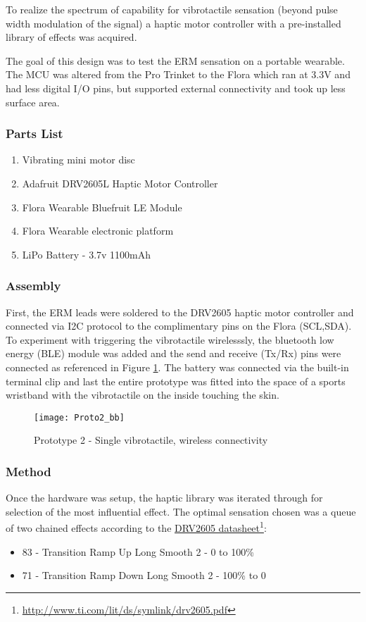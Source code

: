 To realize the spectrum of capability for vibrotactile sensation (beyond pulse width modulation of the signal) a haptic motor controller with a pre-installed library of effects was acquired. 

The goal of this design was to test the ERM sensation on a portable wearable. The MCU was altered from the Pro Trinket to the Flora which ran at 3.3V and had less digital I/O pins, but supported external connectivity and took up less surface area.

\subsubsection{Parts List}
\begin{enumerate}
    \item Vibrating mini motor disc
    \item Adafruit DRV2605L Haptic Motor Controller
    \item Flora Wearable Bluefruit LE Module
    \item Flora Wearable electronic platform
    \item LiPo Battery - 3.7v 1100mAh
\end{enumerate}
\subsubsection{Assembly}
    First, the ERM leads were soldered to the DRV2605 haptic motor controller and connected via I2C protocol to the complimentary pins on the Flora (SCL,SDA).
    To experiment with triggering the vibrotactile wirelesssly, the bluetooth low energy (BLE) module was added and the send and receive (Tx/Rx) pins were connected as referenced in Figure \ref{fig:Proto2}. The battery was connected via the built-in terminal clip and last the entire prototype was fitted into the space of a sports wristband with the vibrotactile on the inside touching the skin.

    \begin{figure}[H]
        \texttt{[image: Proto2\_bb]}
        \caption{Prototype 2 - Single vibrotactile, wireless connectivity}
        \label{fig:Proto2}
    \end{figure}

\subsubsection{Method}
    Once the hardware was setup, the haptic library was iterated through for selection of the most influential effect. The optimal sensation chosen was a queue of two chained effects according to the \underline{DRV2605 datasheet}\footnote{\url{http://www.ti.com/lit/ds/symlink/drv2605.pdf}}:
    \begin{itemize}
        \item 83 - Transition Ramp Up Long Smooth 2 - 0 to 100\%
        \item 71 - Transition Ramp Down Long Smooth 2 - 100\% to 0
    \end{itemize}

